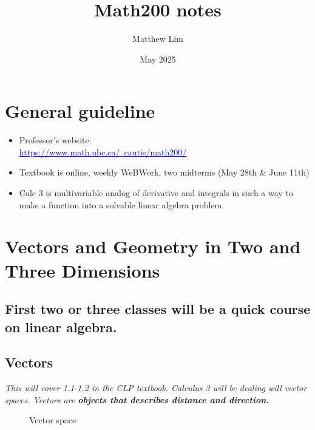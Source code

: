 \documentclass[addpoints]{exam}
\title{Math200 notes}
\author{Matthew Lim}
\date{May 2025}
\begin{document}
\maketitle
\section*{General guideline}
    \begin{itemize}
    \setlength\itemsep{0.1em}
    \item Professor's website:\\ \href{https://personal.math.ubc.ca/~cautis/math200/}{\textcolor{blue}{\underline{https://www.math.ubc.ca/~cautis/math200/}}}
    \item Textbook is online, weekly WeBWork, two midterms (May 28th \& June 11th)
    \item Calc 3 is multivariable analog of derivative and integrals in such a way to make a function into a solvable linear algebra problem.
\end{itemize}
\section{Vectors and Geometry in Two and Three Dimensions}
\subsection*{First two or three classes will be a quick course on linear algebra.}
\subsection{Vectors}
\textit{
This will cover 1.1-1.2 in the CLP textbook. Calculus 3 will be dealing will vector spaces. Vectors are \textbf{objects that describes distance and direction.}
}

\begin{figure}[!h]
    \centering
    \caption{Vector space}
    \label{fig:vector space}
\end{figure}
\end{document}
